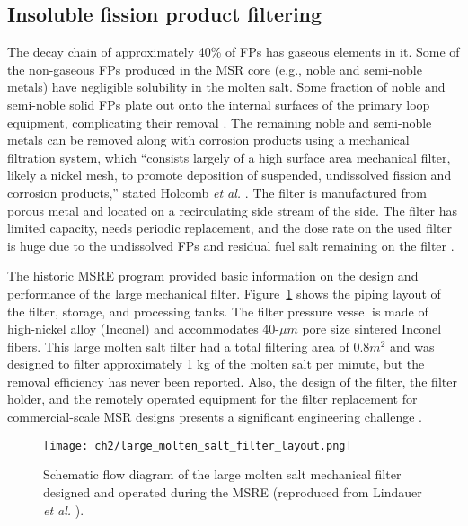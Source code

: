 \subsection{Insoluble fission product filtering}
The decay chain of approximately 40\% of \glspl{FP} has gaseous elements in 
it. Some of the non-gaseous \glspl{FP} produced in the \gls{MSR} core (e.g., 
noble and semi-noble metals) have negligible solubility in the molten salt. 
Some fraction of noble and semi-noble solid \glspl{FP} plate out onto 
the internal surfaces of the primary loop equipment, complicating their 
removal \cite{briggs_molten-salt_1964}. The remaining noble and semi-noble 
metals can be removed along with corrosion products using a mechanical 
filtration system, which ``consists largely of a high surface area mechanical 
filter, likely a nickel mesh, to promote deposition of suspended, undissolved 
fission and corrosion products,'' stated Holcomb \emph{et al.} 
\cite{holcomb_instrumentation_2018}. The filter is manufactured from porous 
metal and located on a recirculating side stream of the side. The filter has 
limited capacity, needs periodic replacement, and the dose rate on the used 
filter is huge due to the undissolved \glspl{FP} and residual fuel 
salt remaining on the filter \cite{mcfarlane_review_2019-1}. 

The historic \gls{MSRE} program provided basic information on the design and 
performance of the large mechanical filter. 
Figure~\ref{fig:large_filter_layout} shows the piping layout of the filter, 
storage, and processing tanks. The filter pressure vessel is made of 
high-nickel alloy (Inconel) and accommodates 40-$\mu m$ pore size sintered 
Inconel fibers. This large molten salt filter had a total filtering area of 
0.8${m^2}$ and was designed to filter approximately 1 kg of the molten salt 
per minute, but the removal efficiency has never been reported. Also, the 
design of the filter, the filter holder, and the remotely operated equipment 
for the filter replacement for commercial-scale \gls{MSR} designs presents a 
significant engineering challenge 
\cite{mcfarlane_review_2019-1}.
\begin{figure}[htp!] %
	\centering
	\texttt{[image: ch2/large\_molten\_salt\_filter\_layout.png]}
	\caption{Schematic flow diagram of the large molten salt mechanical filter 
		designed and operated during the \gls{MSRE} (reproduced from 
		Lindauer \emph{et al.} \cite{lindauer_design_1969}).}
	\label{fig:large_filter_layout}
\end{figure}

